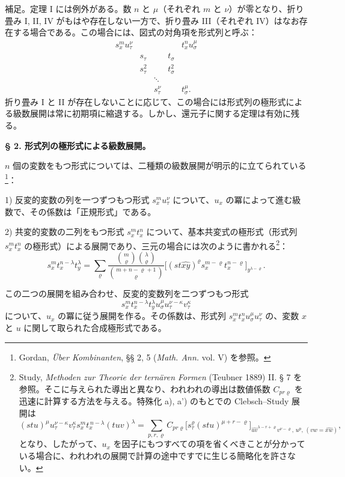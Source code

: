 \documentclass[11pt]{article}
\begin{document}
補足。定理 I には例外がある。数 $n$ と $\mu$（それぞれ $m$ と $\nu$）が零となり、折り畳み I, II, IV がもはや存在しない一方で、折り畳み III（それぞれ IV）はなお存在する場合である。この場合には、図式の対角項を形式列と呼ぶ：
\[
\begin{array}{ccccc}
s_x^m u_\tau^\nu &&&& t_x^n u_\sigma^\mu\\
& s_\tau && t_\sigma &\\
& s_\tau^2 && t_\sigma^2 &\\
&&\ddots&&\\
&&s_\tau^\nu && t_\sigma^\mu .
\end{array}
\]
折り畳み I と II が存在しないことに応じて、この場合には形式列の極形式による級数展開は常に初期項に縮退する。しかし、還元子に関する定理は有効に残る。

\begin{center}
\textbf{§ 2. \quad 形式列の極形式による級数展開。}
\end{center}

$n$ 個の変数をもつ形式については、二種類の級数展開が明示的に立てられている\footnote{Gordan, \emph{Über Kombinanten}, §§ 2, 5 (\emph{Math. Ann.} vol. V) を参照。}：

1) 反変的変数の列を一つずつもつ形式 $s_x^m u_\tau^\nu$ について、$u_x$ の冪によって進む級数で、その係数は「正規形式」である。

2) 共変的変数の二列をもつ形式 $s_x^m t_x^n$ について、基本共変式の極形式（形式列 $s_x^m t_x^n$ の極形式）による展開であり、三元の場合には次のように書かれる\footnote{Study, \emph{Methoden zur Theorie der ternären Formen} (Teubner 1889) II. § 7 を参照。そこに与えられた導出と異なり、われわれの導出は数値係数 $C_{pr\varrho}$ を迅速に計算する方法を与える。特殊化 a), a') のもとでの Clebsch--Study 展開は
\[
(stu)^\mu u_\tau^{\nu-\kappa}v_\tau^\kappa s_x^m t_x^{\,n-\lambda}(tuv)^\lambda
=\sum_{p,r,\varrho} C_{pr\varrho}
\bigl[s_\tau^\varrho(stu)^{\mu+r-\varrho}\bigr]_{\widehat{uv}^{\lambda-r+\varrho}v^{\nu-\varrho},\,u^p,\,(vw=\widehat{xw})},
\]
となり、したがって、$u_x$ を因子にもつすべての項を省くべきことが分かっている場合に、われわれの展開で計算の途中ですでに生じる簡略化を許さない。}：
\[
\tag{I}
s_x^m t_x^{n-\lambda}t_y^\lambda
=\sum_{\varrho}
\frac{\binom{m}{\varrho}\binom{\lambda}{\varrho}}
{\binom{m+n-\varrho+1}{\varrho}}
\bigl[(st\widehat{xy})^\varrho s_x^{m-\varrho}t_x^{n-\varrho}\bigr]_{y^{\lambda-\varrho}}.
\]

この二つの展開を組み合わせ、反変的変数列を二つずつもつ形式
\[
s_x^m t_x^{n-\lambda}t_y^\lambda u_\sigma^\mu u_\tau^{\nu-\kappa}v_\tau^\kappa
\]
について、$u_x$ の冪に従う展開を作る。その係数は、形式列 $s_x^m t_x^n u_\sigma^\mu u_\tau^\nu$ の、変数 $x$ と $u$ に関して取られた合成極形式である。
\end{document}
